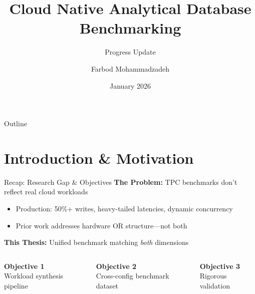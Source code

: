 \documentclass[aspectratio=169]{beamer}
\title[Cloud DB Benchmarking]{Cloud Native Analytical Database Benchmarking}
\subtitle{Progress Update}
\author{Farbod Mohammadzadeh}
\date{January 2026}
\begin{document}
\begin{frame}
    \titlepage
\end{frame}

\begin{frame}{Outline}
    \tableofcontents
\end{frame}

\section{Introduction \& Motivation}

\begin{frame}{Recap: Research Gap \& Objectives}
    \textbf{The Problem:} TPC benchmarks don't reflect real cloud workloads
    \begin{itemize}
        \item Production: 50\%+ writes, heavy-tailed latencies, dynamic concurrency
        \item Prior work addresses hardware OR structure---not both
    \end{itemize}
    
    \vspace{0.4cm}
    \textbf{This Thesis:} Unified benchmark matching \emph{both} dimensions
    
    \vspace{0.3cm}
    \begin{columns}
        \centering
        \textbf{Objective 1}\\[0.2cm]
        Workload synthesis pipeline
        
        \centering
        \textbf{Objective 2}\\[0.2cm]
        Cross-config benchmark dataset
        
        \centering
        \textbf{Objective 3}\\[0.2cm]
        Rigorous validation
    \end{columns}
\end{frame}

\end{document}
